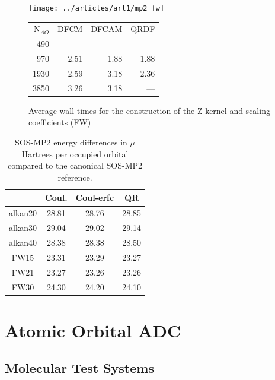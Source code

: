 \begin{figure}
\begin{minipage}{0.5\textwidth}
\centering
\texttt{[image: ../articles/art1/mp2\_fw]}
\end{minipage}
\begin{minipage}{0.4\textwidth}
\centering
\begin{tabular}{rrrr}
\hline
N$_{AO}$ & DFCM & DFCAM & QRDF \\ 
490 & --- & --- & --- \\ 
970 & 2.51 & 1.88 & 1.88 \\ 
1930 & 2.59 & 3.18 & 2.36 \\ 
3850 & 3.26 & 3.18 & --- \\ 
 \hline
\end{tabular}
\end{minipage}
\caption{Average wall times for the construction of the Z kernel and scaling coefficients (FW)}
\label{fig:GS_ZSCALE_FW}
\end{figure}

\begin{table}
\centering
\begin{tabular}{cccc}
 \hline
 & Coul. & Coul-erfc & QR\\ \hline 
alkan20 & 28.81 & 28.76 & 28.85 \\ 
alkan30  & 29.04 & 29.02 & 29.14 \\ 
alkan40 & 28.38 & 28.38 & 28.50 \\ 
FW15 & 23.31 & 23.29 & 23.27 \\ 
FW21 & 23.27 & 23.26 & 23.26 \\ 
FW30 & 24.30 & 24.20 & 24.10 \\ 
\hline 
\end{tabular}
\caption{SOS-MP2 energy differences in $\mu$Hartrees per occupied orbital compared to the canonical SOS-MP2 reference.}
\label{fig:GS_ZACCURACY}
\end{table}

\section{Atomic Orbital ADC}

\subsection{Molecular Test Systems}

